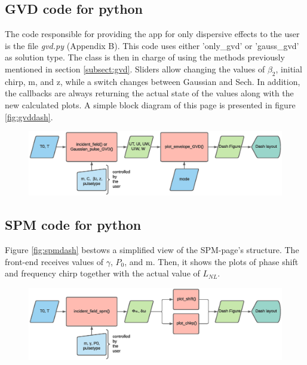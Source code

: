     \subsection{GVD code for python}
    The code responsible for providing the app for only dispersive effects to the user is the file \emph{gvd.py} (Appendix B). This code uses either 'only\_gvd' or 'gauss\_gvd' as solution type. The class is then in charge of using the methods previously mentioned in section \ref{subsect:gvd}. Sliders allow changing  the values of $\beta_2$, initial chirp, m, and z, while a switch changes between Gaussian and Sech. In addition, the callbacks are always returning the actual state of the values along with the new calculated plots.  A simple block diagram of this page is presented in figure \ref{fig:gvddash}.
        
    \begin{figure}[label={fig:gvddash}, caption={Simplified Block-Diagram of gvd.py}]
        	\includegraphics[trim = 2.5cm 12.5cm 5cm 2.5cm, clip, clip,width=1\textwidth]{figures/chap3/GVD.eps} 
        \end{figure}
    \subsection{SPM code for python}
    Figure \ref{fig:spmdash} bestows a simplified view of the SPM-page's structure.  The front-end receives values of $\gamma$, $P_0$, and m. Then, it shows the plots of phase shift and frequency chirp together with the actual value of $L_{NL}$. 
        \begin{figure}[label={fig:spmdash}, caption={Simplified Block-Diagram of spm.py}]
        	\includegraphics[trim = 0.5cm 12.5cm 6.5cm 1.2cm, clip, clip,width=1\textwidth]{figures/chap3/SPM.eps} 
        \end{figure}
        
